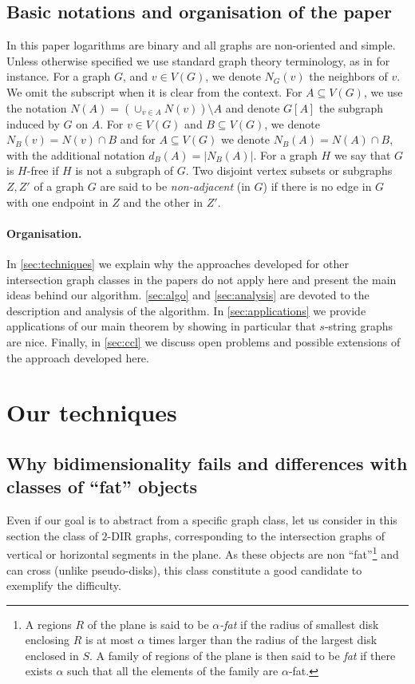 \documentclass{amsart}
\begin{document}
\subsection{Basic notations and organisation of the paper}\label{subsec:basic}
In this paper logarithms are binary and all graphs are non-oriented and simple.
Unless otherwise specified we use standard graph theory terminology, as in \cite{diestel2005graph} for instance. For a graph $G$, and $v\in V(G)$, we denote $N_G(v)$ the neighbors of $v$. We omit the subscript when it is clear from the context. For $A\subseteq V(G)$, we use the notation $N(A)=\left(\cup_{v\in A}N(v)\right)\setminus A$ and denote $G[A]$ the subgraph induced by $G$ on $A$. For $v\in V(G)$ and $B\subseteq V(G)$, we denote $N_B(v)=N(v)\cap B$ and for $A\subseteq V(G)$ we denote $N_B(A)=N(A)\cap B$, with the additional notation $d_B(A)=|N_B(A)|$. For a graph $H$ we say that $G$ is $H$-free if $H$ is not a subgraph of $G$.
Two disjoint vertex subsets or subgraphs $Z,Z'$ of a graph $G$ are said to be \emph{non-adjacent} (in $G$) if there is no edge in $G$ with one endpoint in $Z$ and the other in $Z'$.


\paragraph{Organisation.}
In \autoref{sec:techniques} we explain why the approaches developed for other intersection graph classes in the papers \cite{Faster2023Shinwoo,baste2022contraction,FVS-WG,lokSODA22} do not apply here and present the main ideas behind our algorithm. 
 \autoref{sec:algo} and \autoref{sec:analysis} are devoted to the description and analysis of the algorithm. In \autoref{sec:applications} we provide applications of our main theorem by showing in particular that $s$-string graphs are nice.  Finally, in \autoref{sec:ccl} we discuss open problems and possible extensions of the approach developed here.


\section{Our techniques}
\label{sec:techniques}

\subsection{Why bidimensionality fails and differences with classes of ``fat'' objects}
Even if our goal is to abstract from a specific graph class, let us consider in this section the class of $2$-DIR graphs, corresponding to the intersection graphs of vertical or horizontal segments in the plane. As these objects are non ``fat''\footnote{A regions $R$ of the plane is said to be \emph{$\alpha$-fat} if the radius of smallest disk enclosing $R$ is at most $\alpha$ times larger than the radius of the largest disk enclosed in $S$. A family of regions of the plane is then said to be \emph{fat} if there exists $\alpha$ such that all the elements of the family are $\alpha$-fat.} and can cross (unlike pseudo-disks), this class constitute a good candidate to exemplify the difficulty.
\end{document}
